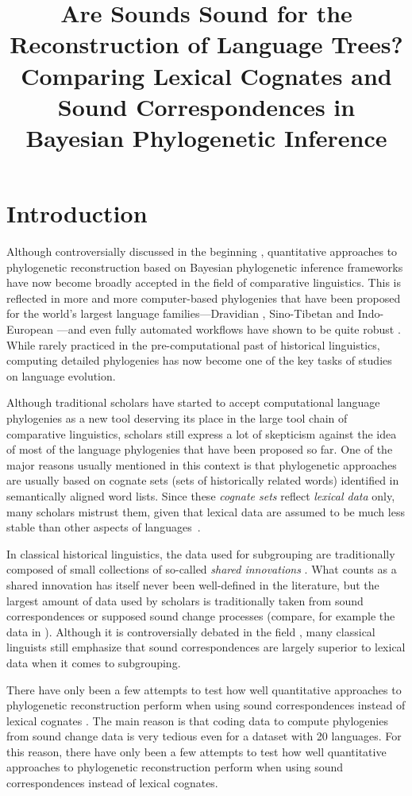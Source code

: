 \documentclass[10pt, a4paper]{article}
\title{Are Sounds Sound for the Reconstruction of Language Trees? Comparing Lexical Cognates and Sound Correspondences in Bayesian Phylogenetic Inference}
\begin{document}
\maketitleabstract%
%
\section{Introduction}

Although controversially discussed in the beginning \citep{Holm2007}, quantitative approaches to phylogenetic reconstruction based on Bayesian phylogenetic inference frameworks have now become broadly accepted in the field of comparative linguistics. This is reflected in more and more computer-based phylogenies that have been proposed for the world's largest language families---Dravidian \citep{Kolipakam2018}, Sino-Tibetan \citep{Sagart2019} and Indo-European \citep{bouckaert2012mapping}---and even fully automated workflows have shown to be quite robust \citep{rama2018automatic}.  While rarely practiced in the pre-computational past of historical linguistics, computing detailed phylogenies has now become one of the key tasks of studies on language evolution.


Although traditional scholars have started to accept computational language phylogenies as a new tool deserving its place in the large tool chain of comparative linguistics, scholars still express a lot of skepticism against the idea of most of the language phylogenies that have been proposed so far. One of the major reasons usually mentioned in this context is that phylogenetic approaches are usually based on cognate sets (sets of historically related words) identified in semantically aligned word lists. Since these \emph{cognate sets} reflect \emph{lexical data} only, many scholars mistrust them, given that lexical data are assumed to be much less stable than other aspects of languages~\cite{CampbellPoser2008}.

In classical historical linguistics, the data used for subgrouping are traditionally composed of small collections of so-called \emph{shared innovations} \citep{Dyen1953}. What counts as a shared innovation has itself never been well-defined in the literature, but the largest amount of data used by scholars is traditionally taken from sound correspondences or supposed sound change processes (compare, for example the data in \citealt[305]{Anttila1972}). Although it is controversially debated in the field \citep{Ringe2002,Dybo2008}, many classical linguists still emphasize that sound correspondences are largely superior to lexical data when it comes to subgrouping.

There have only been a few attempts to test how well quantitative approaches to phylogenetic reconstruction perform when using sound correspondences instead of lexical cognates \citep{Chacon2015a}. The main reason is that coding data to compute phylogenies from sound change data is very tedious even for a dataset with 20 languages.  For this reason, there have only been a few attempts to test how well quantitative approaches to phylogenetic reconstruction perform when using sound correspondences instead of lexical cognates.
\end{document}
